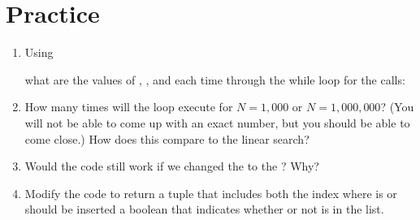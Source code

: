 \documentclass[letterpaper,10pt,english]{sphinxmanual}
\begin{document}
\section{Practice}
\label{\detokenize{lecture_notes/lec20_searching:practice}}\begin{enumerate}
\def\theenumi{\arabic{enumi}}
\def\labelenumi{\theenumi .}
\makeatletter\def\p@enumii{\p@enumi \theenumi .}\makeatother
\item {} 
Using

\begin{sphinxVerbatim}[commandchars=\\\{\}]
  \PYG{p}{[}      \PYG{p}{]}
\end{sphinxVerbatim}

what are the values of , , and  each time
through the while loop for the calls:

\begin{sphinxVerbatim}[commandchars=\\\{\}]
 



 



 




 
\end{sphinxVerbatim}

\item {} 
How many times will the loop execute for \(N = 1,000\) or
\(N = 1,000,000\)? (You will not be able to come up with an exact number,
but you should be able to come close.) How does this compare to the
linear search?

\item {} 
Would the code still work if we changed the \sphinxcode{\sphinxupquote{\textgreater{}}} to the \sphinxcode{\sphinxupquote{\textgreater{}=}}? Why?

\item {} 
Modify the code to return a tuple that includes both the index where
 is or should be inserted  a boolean that indicates
whether or not  is in the list.

\end{enumerate}
\end{document}
